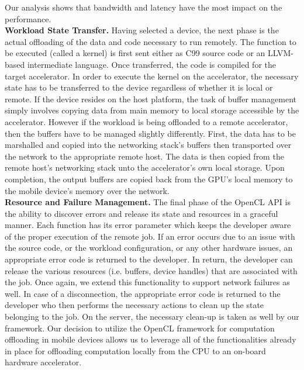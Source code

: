 \documentclass[10pt, conference, compsocconf]{IEEEtran}
\begin{document}
%
Our analysis shows that bandwidth and latency have the most impact on the 
performance.\\
%
\indent\textbf{Workload State Transfer.}
Having selected a device, the next phase is the actual offloading of the data
and code necessary to run remotely.
%
The function to be executed (called a kernel) is first sent either as C99 
source code or an LLVM-based intermediate language.
%
Once transferred, the code is compiled for the target accelerator.
%
In order to execute the kernel on the accelerator, the necessary state 
has to be transferred to the device regardless of whether it is local or 
remote.
%
If the device resides on the host platform, the task of buffer management 
simply involves copying data from main memory to local storage accessible 
by the accelerator.
%
However if the workload is being offloaded to a remote accelerator, then 
the buffers have to be managed slightly differently.
%
First, the data has to be marshalled and copied into the networking stack’s
buffers then transported over the network to the appropriate remote host.
%
The data is then copied from the remote host’s networking stack unto the 
accelerator’s own local storage.
%
Upon completion, the output buffers are copied back from the GPU’s local 
memory to the mobile device’s memory over the network.\\
%
\indent\textbf{Resource and Failure Management.}
The final phase of the OpenCL API is the ability to discover errors and 
release its state and resources in a graceful manner.
%
Each function has its error parameter which keeps the developer aware of 
the proper execution of the remote job.
%
If an error occurs due to an issue with the source code, or the workload 
configuration, or any other hardware issues, an appropriate error code is 
returned to the developer.
%
In return, the developer can release the various resources (i.e. buffers, 
device handles) that are associated with the job.
%
Once again, we extend this functionality to support network failures as well.
%
In case of a disconnection, the appropriate error code is returned to the 
developer who then performs the necessary actions to clean up the state 
belonging to the job.
%
On the server, the necessary clean-up is taken as well by our framework.
%
Our decision to utilize the OpenCL framework for computation offloading in 
mobile devices allows us to leverage all of the functionalities already in 
place for offloading computation locally from the CPU to an on-board hardware 
accelerator.
%
\end{document}
